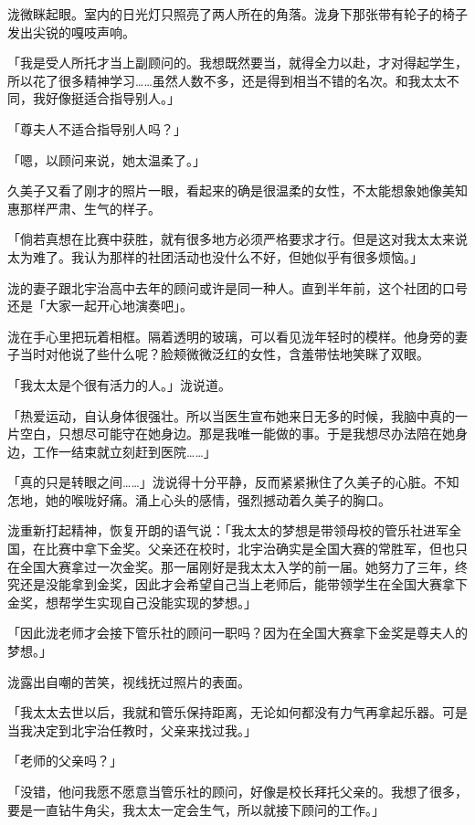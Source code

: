 \documentclass[UTF8]{ctexart}
\begin{document}
    泷微眯起眼。室内的日光灯只照亮了两人所在的角落。泷身下那张带有轮子的椅子发出尖锐的嘎吱声响。 

    「我是受人所托才当上副顾问的。我想既然要当，就得全力以赴，才对得起学生，所以花了很多精神学习……虽然人数不多，还是得到相当不错的名次。和我太太不同，我好像挺适合指导别人。」 

    「尊夫人不适合指导别人吗？」 

    「嗯，以顾问来说，她太温柔了。」 

    久美子又看了刚才的照片一眼，看起来的确是很温柔的女性，不太能想象她像美知惠那样严肃、生气的样子。 

    「倘若真想在比赛中获胜，就有很多地方必须严格要求才行。但是这对我太太来说太为难了。我认为那样的社团活动也没什么不好，但她似乎有很多烦恼。」 

    泷的妻子跟北宇治高中去年的顾问或许是同一种人。直到半年前，这个社团的口号还是「大家一起开心地演奏吧」。 

    泷在手心里把玩着相框。隔着透明的玻璃，可以看见泷年轻时的模样。他身旁的妻子当时对他说了些什么呢？脸颊微微泛红的女性，含羞带怯地笑眯了双眼。 

    「我太太是个很有活力的人。」泷说道。 

    「热爱运动，自认身体很强壮。所以当医生宣布她来日无多的时候，我脑中真的一片空白，只想尽可能守在她身边。那是我唯一能做的事。于是我想尽办法陪在她身边，工作一结束就立刻赶到医院……」 

    「真的只是转眼之间……」泷说得十分平静，反而紧紧揪住了久美子的心脏。不知怎地，她的喉咙好痛。涌上心头的感情，强烈撼动着久美子的胸口。 

    泷重新打起精神，恢复开朗的语气说：「我太太的梦想是带领母校的管乐社进军全国，在比赛中拿下金奖。父亲还在校时，北宇治确实是全国大赛的常胜军，但也只在全国大赛拿过一次金奖。那一届刚好是我太太入学的前一届。她努力了三年，终究还是没能拿到金奖，因此才会希望自己当上老师后，能带领学生在全国大赛拿下金奖，想帮学生实现自己没能实现的梦想。」 

    「因此泷老师才会接下管乐社的顾问一职吗？因为在全国大赛拿下金奖是尊夫人的梦想。」 

    泷露出自嘲的苦笑，视线抚过照片的表面。 

    「我太太去世以后，我就和管乐保持距离，无论如何都没有力气再拿起乐器。可是当我决定到北宇治任教时，父亲来找过我。」 

    「老师的父亲吗？」 

    「没错，他问我愿不愿意当管乐社的顾问，好像是校长拜托父亲的。我想了很多，要是一直钻牛角尖，我太太一定会生气，所以就接下顾问的工作。」 
\end{document}
